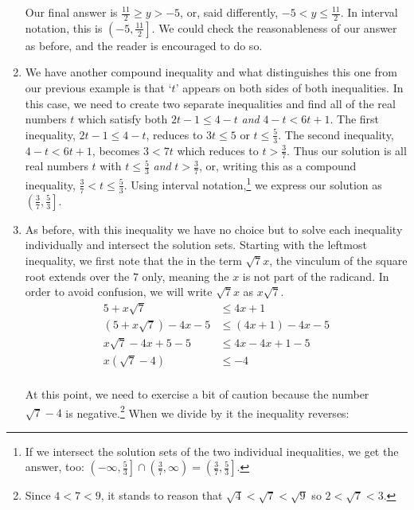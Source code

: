 \begin{ex}
\begin{enumerate}
Our final answer is $\frac{11}{2} \geq y > -5$, or, said differently,  $-5 < y \leq \frac{11}{2}$. In interval notation, this is $\left( -5, \frac{11}{2} \right]$.  We could check the reasonableness of our answer as before, and the reader is encouraged to do so.  

\item  We have another compound inequality and what distinguishes this one from our previous example is that `$t$' appears on both sides of both inequalities.  In this case, we need to create two separate inequalities and find all of the real numbers $t$ which satisfy both  $2t-1 \leq 4-t$ \textit{and} $4-t < 6t + 1$.  The first inequality, $2t-1 \leq 4-t$, reduces to $3t \leq 5$ or $t \leq \frac{5}{3}$.  The second inequality, $4-t < 6t+1$, becomes $3 < 7t$  which reduces to $t > \frac{3}{7}$.  Thus our solution is all real numbers $t$ with $t \leq \frac{5}{3}$ \textit{and}  $t > \frac{3}{7}$, or, writing this as a compound inequality,  $\frac{3}{7} < t \leq \frac{5}{3}$. Using interval notation,\footnote{If we intersect the solution sets of the two individual inequalities, we get the answer, too:  $\left(-\infty, \frac{5}{3}\right] \cap \left(\frac{3}{7}, \infty\right) = \left( \frac{3}{7}, \frac{5}{3} \right]$.} we express our solution as $\left( \frac{3}{7}, \frac{5}{3} \right]$.


\item As before, with this inequality  we have no choice but to solve each inequality individually and intersect the solution sets.  Starting with the leftmost inequality, we first note that the in the term $\sqrt{7} x$, the vinculum of the square root extends over the $7$ only, meaning the $x$ is not part of the radicand.  In order to avoid confusion, we will write $\sqrt{7} x$ as $x \sqrt{7}$.
\begin{align*}
5 + x\sqrt{7}  & \leq 4x+1  \\
(5 + x\sqrt{7} ) -4x  - 5 & \leq  (4x + 1) - 4x - 5  \tag{Subtract $4x$ and $5$} \\
x\sqrt{7} - 4x + 5 - 5 & \leq  4x - 4x + 1 - 5 \tag{Rearrange terms} \\
x(\sqrt{7} - 4) & \leq -4  \tag{Factor} \\
\end{align*}

At this point, we need to exercise a bit of caution because the number $\sqrt{7} - 4$ is negative.\footnote{Since $4 < 7 < 9$, it stands to reason that $\sqrt{4} < \sqrt{7} < \sqrt{9}$ so $2 < \sqrt{7} < 3$.} When we divide by it the inequality reverses:


\end{enumerate}
\end{ex}
